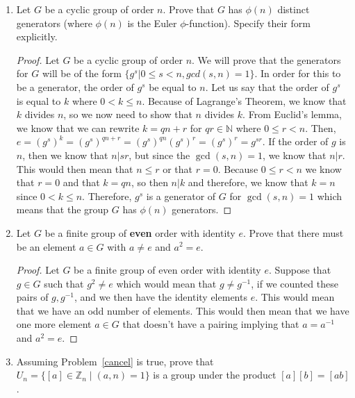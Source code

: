 \documentclass[11pt]{article}
\newcommand{\Z}{\mathbb{Z}}
\newcommand{\N}{\mathbb{N}}
\begin{document}
\begin{enumerate}
\begin{enumerate}
\end{enumerate}
\pagebreak

\item Let $G$ be a cyclic group of order $n$.  Prove that $G$ has
$\phi(n)$ distinct generators (where $\phi(n)$ is the Euler $\phi$-function).  
Specify their form explicitly.\\

\begin{proof}
Let $G$ be a cyclic group of order $n$. We will prove that the generators for $G$ will be of the form $\{g^s|0\leq s < n, gcd(s,n)=1\}$. In order for this to be a generator, the order of $g^s$ be equal to $n$. Let us say that the order of $g^s$ is equal to $k$ where $0<k\leq n$. Because of Lagrange's Theorem, we know that $k$ divides $n$, so we now need to show that $n$ divides $k.$ From Euclid's lemma, we know that we can rewrite $k= qn + r$ for $qr\in\N$ where $0\leq r < n$. Then, $e=(g^s)^k=(g^s)^{qn+r}=(g^s)^{qn}(g^s)^r=(g^s)^r=g^{sr}.$ If the order of $g$ is $n$, then we know that $n|sr$, but since the $\gcd (s,n)=1$, we know that $n|r$. This would then mean that $n\leq r$ or that $r=0$. Because $0\leq r< n$ we know that $r=0$ and that $k=qn$, so then $n|k$ and therefore, we know that $k=n$ since $0< k\leq n$. Therefore, $g^s$ is a generator of $G$ for $\gcd (s,n)=1$ which means that the group $G$ has $\phi (n)$ generators.
\end{proof}

\pagebreak

\item Let $G$ be a finite group of \textbf{even} order with identity $e$.  
Prove that there must be an element $a \in G$ with $a \neq e$ and $a^2 = e$.\\

\begin{proof}
Let $G$ be a finite group of even order with identity $e$. Suppose that $g\in G$ such that $g^2\neq e$ which would mean that $g\neq g^{-1}$, if we counted these pairs of $g,g^{-1}$, and we then have the identity elements $e$. This would mean that we have an odd number of elements. This would then mean that we have one more element $a\in G$ that doesn't have a pairing implying that $a=a^{-1}$ and $a^2=e.$
\end{proof}

\pagebreak
\item Assuming Problem~\ref{cancel} is true, prove that 
$U_n =  \{ [a] \in \Z_n \mid (a,n) = 1\}$ is a group under the 
product $[a][b] = [ab]$.\\


\end{enumerate}
\end{document}
